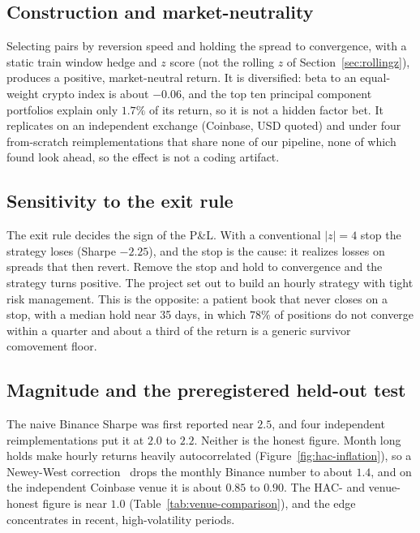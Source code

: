 \documentclass[11pt]{article}
\begin{document}
\subsection{Construction and market-neutrality}

Selecting pairs by reversion speed and holding the spread to convergence, with a static
train window hedge and $z$ score (not the rolling $z$ of Section~\ref{sec:rollingz}), produces a
positive, market-neutral return. It is diversified: beta to an equal-weight crypto index is about $-0.06$,
and the top ten principal component portfolios explain only $1.7\%$ of its return, so it is not a
hidden factor bet. It replicates on an independent exchange (Coinbase, USD quoted) and under four
from-scratch reimplementations that share none of our pipeline, none of which found look ahead,
so the effect is not a coding artifact.

\subsection{Sensitivity to the exit rule}

The exit rule decides the sign of the P\&L. With a conventional $|z| = 4$ stop the strategy loses
(Sharpe $-2.25$), and the stop is the cause: it realizes losses on spreads that then revert.
Remove the stop and hold to convergence and the strategy turns positive. The project set out to
build an hourly strategy with tight risk management. This is the opposite: a patient book that
never closes on a stop, with a median hold near 35 days, in which $78\%$ of positions do not converge within a quarter and
about a third of the return is a generic survivor comovement floor.

\subsection{Magnitude and the preregistered held-out test}

The naive Binance Sharpe was first reported near $2.5$, and four independent reimplementations put
it at $2.0$ to $2.2$. Neither is the honest figure. Month long holds make hourly returns heavily
autocorrelated (Figure~\ref{fig:hac-inflation}), so a Newey-West correction~\cite{newey1987hac}
drops the monthly Binance number to about $1.4$, and
on the independent Coinbase venue it is about $0.85$ to $0.90$. The HAC- and venue- honest figure
is near $1.0$ (Table~\ref{tab:venue-comparison}), and the edge concentrates in recent, high-volatility periods.
\end{document}
